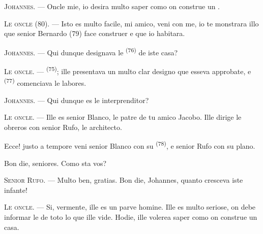 %
%

\VUsaut{6.0mm}
\VUsaut{1.4mm}
\VUsaut{2.2mm}

\VUsaut{3.0mm}

\textsc{Johannes}. --- Oncle mie, io desira multo saper como on construe un
.

\textsc{Le oncle} (80). --- Isto es multo facile, mi amico, veni con me, io te
monstrara illo que senior Bernardo (79) face construer e que io habitara.

\textsc{Johannes}. --- Qui dunque designava le 
\textsuperscript{(76)} de iste casa?

\textsc{Le oncle}. ---  \textsuperscript{(75)}; ille
presentava un multo clar designo que esseva approbate, e  \textsuperscript{(77)} comenciava le labores.

\textsc{Johannes}. --- Qui dunque es le interprenditor?

\textsc{Le oncle}. --- Ille es senior Blanco, le patre de tu amico Jacobo. Ille
dirige le obreros con senior Rufo, le architecto.

Ecce! justo a tempore veni senior Blanco con su 
\textsuperscript{(78)}, e senior Rufo con su plano.

Bon die, seniores. Como sta vos?

\textsc{Senior Rufo}. --- Multo ben, gratias. Bon die, Johannes, quanto cresceva
iste infante!

\textsc{Le oncle}. --- Si, vermente, ille es un parve homine. Ille es multo
seriose, on debe informar le de toto lo que ille vide. Hodie, ille volerea
saper como on construe un casa.

